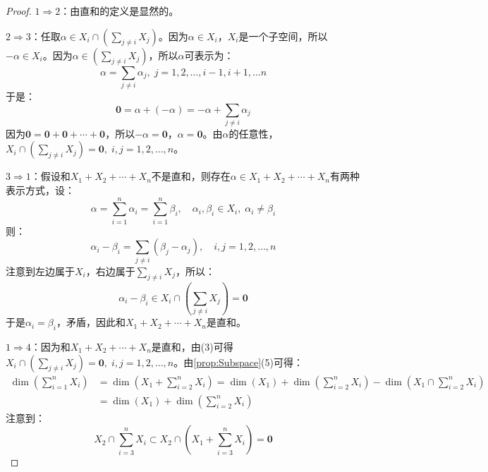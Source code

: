 \begin{proof}
	$1\Rightarrow2$：由直和的定义是显然的。\par
	$2\Rightarrow3$：任取$\alpha\in X_i\cap\left(\sum\limits_{j\ne i}X_j\right)$。因为$\alpha\in X_i$，$X_i$是一个子空间，所以$-\alpha\in X_i$。因为$\alpha\in\left(\sum\limits_{j\ne i}X_j\right)$，所以$\alpha$可表示为：
	\begin{equation*}
		\alpha=\sum_{j\ne i}\alpha_j,\;j=1,2,\dots,i-1,i+1,\dots n
	\end{equation*}
	于是：
	\begin{equation*}
		\mathbf{0}=\alpha+(-\alpha)=-\alpha+\sum_{j\ne i}\alpha_j
	\end{equation*}
	因为$\mathbf{0}=\mathbf{0}+\mathbf{0}+\cdots+\mathbf{0}$，所以$-\alpha=\mathbf{0}$，$\alpha=\mathbf{0}$。由$\alpha$的任意性，$X_i\cap\left(\sum\limits_{j\ne i}X_j\right)=\mathbf{0},\;i,j=1,2,\dots,n$。\par
	$3\Rightarrow1$：假设和$X_1+X_2+\cdots+X_n$不是直和，则存在$\alpha\in X_1+X_2+\cdots+X_n$有两种表示方式，设：
	\begin{equation*}
		\alpha=\sum_{i=1}^{n}\alpha_i=\sum_{i=1}^{n}\beta_i,\quad
		\alpha_i,\beta_i\in X_i,\;\alpha_i\ne\beta_i
	\end{equation*}
	则：
	\begin{equation*}
		\alpha_i-\beta_i=\sum_{j\ne i}(\beta_j-\alpha_j),\quad i,j=1,2,\dots,n
	\end{equation*}
	注意到左边属于$X_i$，右边属于$\sum\limits_{j\ne i}X_j$，所以：
	\begin{equation*}
		\alpha_i-\beta_i\in X_i\cap\left(\sum\limits_{j\ne i}X_j\right)=\mathbf{0}
	\end{equation*}
	于是$\alpha_i=\beta_i$，矛盾，因此和$X_1+X_2+\cdots+X_n$是直和。\par
	$1\Rightarrow4$：因为和$X_1+X_2+\cdots+X_n$是直和，由(3)可得$X_i\cap\left(\sum\limits_{j\ne i}X_j\right)=\mathbf{0},\;i,j=1,2,\dots,n$。由\cref{prop:Subspace}(5)可得：
	\begin{align*}
		\dim\left(\sum_{i=1}^{n}X_i\right)
		&=\dim\left(X_1+\sum_{i=2}^{n}X_i\right)
		=\dim(X_1)+\dim\left(\sum_{i=2}^{n}X_i\right)-\dim\left(X_1\cap\sum_{i=2}^{n}X_i\right) \\
		&=\dim(X_1)+\dim\left(\sum_{i=2}^{n}X_i\right)
	\end{align*}
	注意到：
	\begin{equation*}
		X_2\cap\sum_{i=3}^{n}X_i\subset X_2\cap\left(X_1+\sum_{i=3}^{n}X_i\right)=\mathbf{0}
	\end{equation*}

\end{proof}
